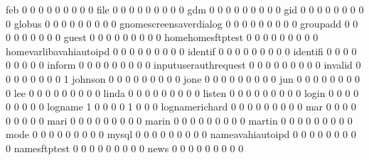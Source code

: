 \documentclass[compress,8pt]{beamer}
\begin{document}
\begin{frame}
\begin{Schunk}
  feb                                        0   0   0   0   0   0   0   0   0
  file                                       0   0   0   0   0   0   0   0   0
  gdm                                        0   0   0   0   0   0   0   0   0
  gid                                        0   0   0   0   0   0   0   0   0
  globus                                     0   0   0   0   0   0   0   0   0
  gnomescreensaverdialog                     0   0   0   0   0   0   0   0   0
  groupadd                                   0   0   0   0   0   0   0   0   0
  guest                                      0   0   0   0   0   0   0   0   0
  homehomesftptest                           0   0   0   0   0   0   0   0   0
  homevarlibavahiautoipd                     0   0   0   0   0   0   0   0   0
  identif                                    0   0   0   0   0   0   0   0   0
  identifi                                   0   0   0   0   0   0   0   0   0
  inform                                     0   0   0   0   0   0   0   0   0
  inputuserauthrequest                       0   0   0   0   0   0   0   0   0
  invalid                                    0   0   0   0   0   0   0   0   1
  johnson                                    0   0   0   0   0   0   0   0   0
  jone                                       0   0   0   0   0   0   0   0   0
  jun                                        0   0   0   0   0   0   0   0   0
  lee                                        0   0   0   0   0   0   0   0   0
  linda                                      0   0   0   0   0   0   0   0   0
  listen                                     0   0   0   0   0   0   0   0   0
  login                                      0   0   0   0   0   0   0   0   0
  logname                                    1   0   0   0   0   1   0   0   0
  lognamerichard                             0   0   0   0   0   0   0   0   0
  mar                                        0   0   0   0   0   0   0   0   0
  mari                                       0   0   0   0   0   0   0   0   0
  marin                                      0   0   0   0   0   0   0   0   0
  martin                                     0   0   0   0   0   0   0   0   0
  mode                                       0   0   0   0   0   0   0   0   0
  mysql                                      0   0   0   0   0   0   0   0   0
  nameavahiautoipd                           0   0   0   0   0   0   0   0   0
  namesftptest                               0   0   0   0   0   0   0   0   0
  news                                       0   0   0   0   0   0   0   0   0

\end{Schunk}
\end{frame}
\end{document}

